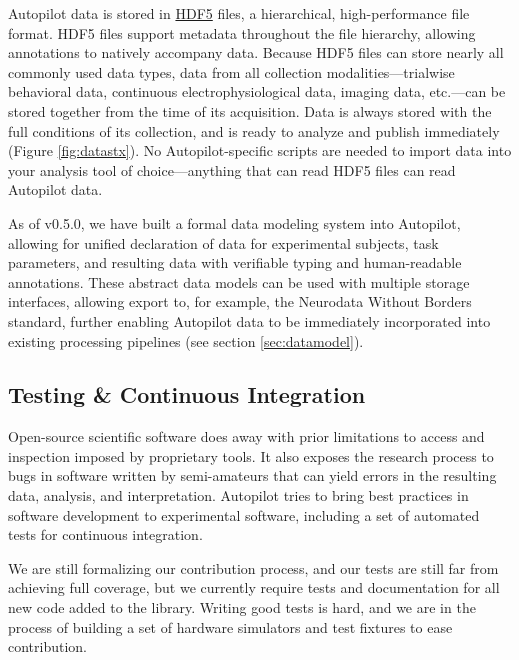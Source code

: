 Autopilot data is stored in \href{https://support.hdfgroup.org/HDF5/whatishdf5.html}{HDF5} files, a hierarchical, high-performance file format. HDF5 files support metadata throughout the file hierarchy, allowing annotations to natively accompany data. Because HDF5 files can store nearly all commonly used data types, data from all collection modalities---trialwise behavioral data, continuous electrophysiological data, imaging data, etc.---can be stored together from the time of its acquisition. Data is always stored with the full conditions of its collection, and is ready to analyze and publish immediately (Figure \ref{fig:datastx}). No Autopilot-specific scripts are needed to import data into your analysis tool of choice---anything that can read HDF5 files can read Autopilot data. 

As of v0.5.0, we have built a formal data modeling system into Autopilot, allowing for unified declaration of data for experimental subjects, task parameters, and resulting data with verifiable typing and human-readable annotations. These abstract data models can be used with multiple storage interfaces, allowing export to, for example, the Neurodata Without Borders standard\citep{rubelNWBAccessibleData2019}, further enabling Autopilot data to be immediately incorporated into existing processing pipelines (see section \ref{sec:datamodel}).

\subsection{Testing \& Continuous Integration}

Open-source scientific software does away with prior limitations to access and inspection imposed by proprietary tools. It also exposes the research process to bugs in software written by semi-amateurs that can yield errors in the resulting data, analysis, and interpretation\citep{soergelRampantSoftwareErrors2015,eklundClusterFailureWhy2016a,bhandarineupaneCharacterizationLeptazolinesPolar2019,millerScientistNightmareSoftware2006}. Autopilot tries to bring best practices in software development to experimental software, including a set of automated tests for continuous integration. 

We are still formalizing our contribution process, and our tests are still far from achieving full coverage, but we currently require tests and documentation for all new code added to the library. Writing good tests is hard, and we are in the process of building a set of hardware simulators and test fixtures to ease contribution.  

